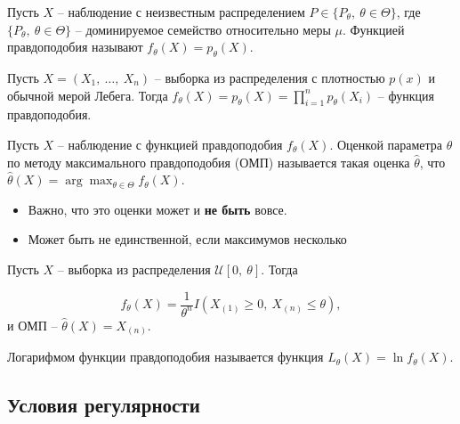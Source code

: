 \begin{definition}
    Пусть $\displaystyle X$ -- наблюдение с неизвестным распределением $\displaystyle P\in \{P_{\theta } ,\ \theta \in \Theta \}$, где $\displaystyle \{P_{\theta } ,\ \theta \in \Theta \}$ -- доминируемое семейство относительно меры $\displaystyle \mu $. Функцией правдоподобия называют $\displaystyle f_{\theta }( X) =p_{\theta }( X)$.
\end{definition}
\begin{example}
    Пусть $\displaystyle X=( X_{1} ,\ \dotsc ,\ X_{n})$ -- выборка из распределения с плотностью $\displaystyle p( x)$ и обычной мерой Лебега. Тогда $\displaystyle f_{\theta }( X) =p_{\theta }( X) =\prod _{i=1}^{n} p_{\theta }( X_{i})$ -- функция правдоподобия.
\end{example}
\begin{definition}
    Пусть $\displaystyle X$ -- наблюдение с функцией правдоподобия $\displaystyle f_{\theta }( X)$. Оценкой параметра $\displaystyle \theta $ по методу максимального правдоподобия (ОМП) называется такая оценка $\displaystyle \hat{\theta }$, что $\displaystyle \hat{\theta }( X) =\arg\max_{\theta \in \Theta } f_{\theta }( X)$.
\end{definition}
\begin{note}
\begin{itemize}
    \item Важно, что это оценки может и \textbf{не быть} вовсе.
    \item Может быть не единственной, если максимумов несколько
\end{itemize}
\end{note}
\begin{example}
    Пусть $\displaystyle X$ -- выборка из распределения $\displaystyle \mathcal{U}[ 0,\ \theta ]$. Тогда
    
    
    \begin{equation*}
        f_{\theta }( X) =\dfrac{1}{\theta ^{n}} I( X_{( 1)} \geqslant 0,\ X_{( n)} \leqslant \theta ) ,
    \end{equation*}
    и ОМП -- $\displaystyle \hat{\theta }( X) =X_{( n)}$.
\end{example}
\begin{definition}
    Логарифмом функции правдоподобия называется функция $\displaystyle L_{\theta }( X) =\ln f_{\theta }( X)$.
\end{definition}

\subsection*{Условия регулярности}

